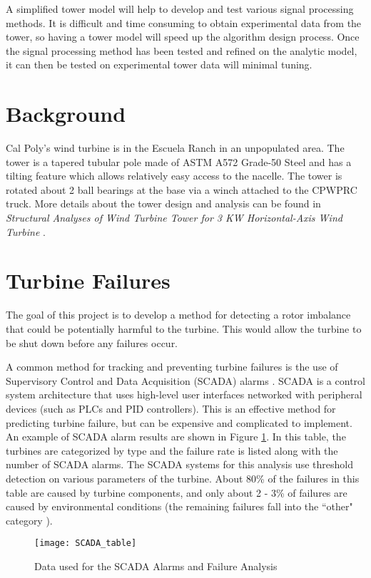 A simplified tower model will help to develop and test various signal processing methods.  It is difficult and time consuming to obtain experimental data from the tower, so having a tower model will speed up the algorithm design process.  Once the signal processing method has been tested and refined on the analytic model, it can then be tested on experimental tower data will minimal tuning.

\section{Background}
Cal Poly’s wind turbine is in the Escuela Ranch in an unpopulated area.  The tower is a tapered tubular pole made of ASTM A572 Grade-50 Steel and has a tilting feature which allows relatively easy access to the nacelle.  The tower is rotated about 2 ball bearings at the base via a winch attached to the CPWPRC truck.  More details about the tower design and analysis can be found in \textit{Structural Analyses of Wind Turbine Tower for 3 KW Horizontal-Axis Wind Turbine} \cite{Gwon_paper}.

\section{Turbine Failures}
The goal of this project is to develop a method for detecting a rotor imbalance that could be potentially harmful to the turbine.  This would allow the turbine to be shut down before any failures occur.  

A common method for tracking and preventing turbine failures is the use of Supervisory Control and Data Acquisition (SCADA) alarms \cite{WT_failures_paper}.  SCADA is a control system architecture that uses high-level user interfaces networked with peripheral devices (such as PLCs and PID controllers).  This is an effective method for predicting turbine failure, but can be expensive and complicated to implement.  An example of SCADA alarm results are shown in Figure \ref{fig:SCADA_table}.  In this table, the turbines are categorized by type and the failure rate is listed along with the number of SCADA alarms.  The SCADA systems for this analysis use threshold detection on various parameters of the turbine.  About 80\% of the failures in this table are caused by turbine components, and only about 2 - 3\% of failures are caused by environmental conditions (the remaining failures fall into the ``other" category \cite{wind_turbine_failures}).

\begin{figure}
	\centering
	\texttt{[image: SCADA\_table]}
	\decoRule
	\caption{Data used for the SCADA Alarms and Failure Analysis \cite{wind_turbine_failures}}
	\label{fig:SCADA_table}
\end{figure}


